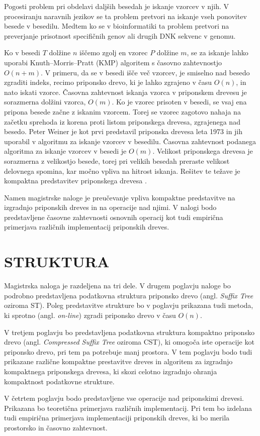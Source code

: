 Pogosti problem pri obdelavi daljših besedah je iskanje vzorcev v njih. V procesiranju naravnih jezikov se ta problem pretvori na iskanje vseh ponovitev besede v besedilu. Medtem ko se v bioinformatiki ta problem pretvori na preverjanje prisotnost specifičnih genov ali drugih DNK sekvenc v genomu. 

Ko v besedi $T$ dolžine $n$ iščemo zgolj en vzorec $P$ dolžine $m$, se za iskanje lahko uporabi Knuth–Morris–Pratt (KMP) algoritem s časovno zahtevnostjo $O(n+m)$.  V primeru, da se v besedi išče več vzorcev, je smiselno nad besedo zgraditi indeks, recimo priponsko drevo, ki je lahko zgrajeno v času $O(n)$, in nato iskati vzorce. Časovna zahtevnost iskanja vzorca v priponskem drevesu je sorazmerna dolžini vzorca, $O(m)$. Ko je vzorec prisoten v besedi, se vsaj ena pripona besede začne z iskanim vzorcem. 
Torej se vzorec zagotovo nahaja na začetku sprehoda iz korena proti listom priponskega drevesa, zgrajenega nad besedo. 
Peter Weiner je kot prvi predstavil priponska drevesa leta 1973 \cite{Weiner1973} in jih uporabil v algoritmu za iskanje vzorcev v besedilu. Časovna zahtevnost podanega algoritma za iskanje vzorcev v besedi je $O(m)$. Velikost priponskega drevesa je sorazmerna z velikostjo besede, torej pri velikih besedah preraste velikost delovnega spomina, kar močno vpliva na hitrost iskanja. Rešitev te težave je kompaktna predstavitev priponskega drevesa \cite{Navarro2016}.

Namen magistrske naloge je preučevanje vpliva kompaktne predstavitve na izgradnjo priponskih dreves in na operacije nad njimi. V nalogi bodo predstavljene  časovne zahtevnosti osnovnih operacij kot tudi empirična primerjava različnih implementacij priponskih dreves.

\section{STRUKTURA}\label{sec:struktura}

Magistrska naloga je razdeljena na tri dele. V drugem poglavju naloge bo podrobno predstavljena podatkovna struktura priponsko drevo (angl. \textit{Suffix Tree} oziroma ST). Poleg predstavitve strukture bo v poglavju prikazana tudi metoda, ki sprotno (angl. \textit{on-line}) zgradi priponsko drevo v času $O(n)$.


V tretjem poglavju bo predstavljena podatkovna struktura kompaktno priponsko drevo (angl. \textit{Compressed Suffix Tree} oziroma CST), ki omogoča iste operacije kot priponsko drevo, pri tem pa potrebuje manj prostora. V tem poglavju bodo tudi prikazane različne kompaktne prestavitve dreves in algoritem za izgradnjo kompaktnega priponskega drevesa, ki skozi celotno izgradnjo ohranja kompaktnost podatkovne strukture.

V četrtem poglavju bodo predstavljene vse operacije nad priponskimi drevesi. Prikazana bo teoretična primerjava različnih implementacij. Pri tem bo izdelana tudi empirična primerjava implementaciji priponskih dreves, ki bo merila prostorsko in časovno zahtevnost.
